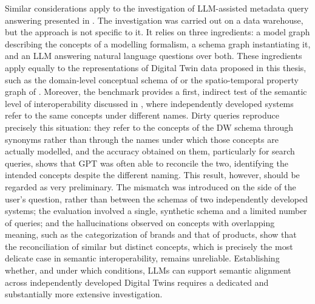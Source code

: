 \begin{partsummary}
{Similar considerations apply to the investigation of LLM-assisted metadata query answering presented in . The investigation was carried out on a data warehouse, but the approach is not specific to it. It relies on three ingredients: a model graph describing the concepts of a modelling formalism, a schema graph instantiating it, and an LLM answering natural language questions over both. These ingredients apply equally to the representations of Digital Twin data proposed in this thesis, such as the domain-level conceptual schema of  or the spatio-temporal property graph of . Moreover, the benchmark provides a first, indirect test of the semantic level of interoperability discussed in , where independently developed systems refer to the same concepts under different names. Dirty queries reproduce precisely this situation: they refer to the concepts of the DW schema through synonyms rather than through the names under which those concepts are actually modelled, and the accuracy obtained on them, particularly for search queries, shows that GPT was often able to reconcile the two, identifying the intended concepts despite the different naming. This result, however, should be regarded as very preliminary. The mismatch was introduced on the side of the user's question, rather than between the schemas of two independently developed systems; the evaluation involved a single, synthetic schema and a limited number of queries; and the hallucinations observed on concepts with overlapping meaning, such as the categorization of brands and that of products, show that the reconciliation of similar but distinct concepts, which is precisely the most delicate case in semantic interoperability, remains unreliable. Establishing whether, and under which conditions, LLMs can support semantic alignment across independently developed Digital Twins requires a dedicated and substantially more extensive investigation.
}
\end{partsummary}